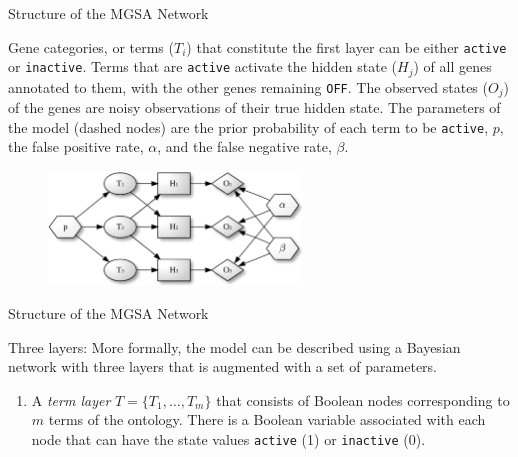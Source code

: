 \documentclass{beamer}
\begin{document}
\begin{frame}[fragile]{Structure of the MGSA Network}

  Gene
categories, or terms ($T_i$) that constitute the first layer can be either
\texttt{active} or \texttt{inactive}. Terms that are \texttt{active} activate the hidden state
($H_j$) of all genes annotated to them, with the other genes remaining \texttt{OFF}. The
observed states ($O_j$) of the genes are noisy observations of
their true hidden state. The parameters of the model (dashed nodes) are the
prior probability of each term to be \texttt{active}, $p$, the false positive rate, $\alpha$,
and the false negative rate, $\beta$.
\begin{figure}
 \centering
 \includegraphics[width=0.6\textwidth]{./img/mgsa-F1.jpg}
\end{figure}

\end{frame}

\begin{frame}[fragile]{Structure of the MGSA Network}
 \begin{mybluebox}{Three layers: }
  More formally, the model can be described using a Bayesian network with three
layers that is augmented with a set of parameters.
 \end{mybluebox}
\begin{enumerate}
 \item A \emph{term layer} $T=\{T_1,\ldots,T_m\}$ that consists of Boolean nodes
 corresponding to $m$ terms of the ontology. There is a Boolean variable
 associated with each node that can have the state values \texttt{active} (1) or \texttt{inactive} 
(0). 
\end{enumerate}

 
 
\end{frame}
\end{document}
